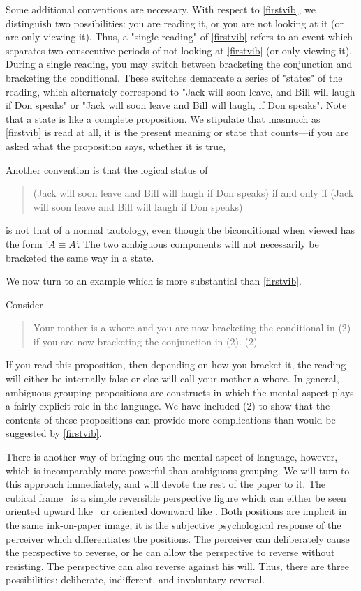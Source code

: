 Some additional conventions are necessary. With respect to \ref{firstvib}, we 
distinguish two possibilities: you are reading it, or you are not looking at it 
(or are only viewing it). Thus, a "single reading" of \ref{firstvib} refers to an event 
which separates two consecutive periods of not looking at \ref{firstvib} (or only 
viewing it). During a single reading, you may switch between bracketing the 
conjunction and bracketing the conditional. These switches demarcate a 
series of "states" of the reading, which alternately correspond to "Jack will 
soon leave, and Bill will laugh if Don speaks" or "Jack will soon leave and Bill 
will laugh, if Don speaks". Note that a state is like a complete proposition. 
We stipulate that inasmuch as \ref{firstvib} is read at all, it is the present meaning or 
state that counts---if you are asked what the proposition says, whether it is 
true, \etc

Another convention is that the logical status of 
\begin{quotation}
(Jack will soon leave and Bill will laugh if Don speaks) if and only if (Jack 
will soon leave and Bill will laugh if Don speaks) 
\end{quotation}
is not that of a normal tautology, even though the biconditional when 
viewed has the form '$A\equiv A$'. The two ambiguous components will not 
necessarily be bracketed the same way in a state. 

We now turn to an example which is more substantial than \ref{firstvib}.

Consider 

\begin{quotation}
Your mother is a whore and you are now bracketing the conditional in (2) if 
you are now bracketing the conjunction in (2). (2) 
\end{quotation}

If you read this proposition, then depending on how you bracket it, the 
reading will either be internally false or else will call your mother a whore. In 
general, ambiguous grouping propositions are constructs in which the mental 
aspect plays a fairly explicit role in the language. We have included (2) to 
show that the contents of these propositions can provide more complications 
than would be suggested by \ref{firstvib}.

There is another way of bringing out the mental aspect of language, 
however, which is incomparably more powerful than ambiguous grouping. 
We will turn to this approach immediately, and will devote the rest of the 
paper to it. The cubical frame \cubeframe\ is a simple reversible perspective figure 
which can either be seen oriented upward like \cubeup\ or oriented downward 
like \cubedown. Both positions are implicit in the same ink-on-paper image; it is 
the subjective psychological response of the perceiver which differentiates 
the positions. The perceiver can deliberately cause the perspective to reverse, 
or he can allow the perspective to reverse without resisting. The perspective 
can also reverse against his will. Thus, there are three possibilities: deliberate, 
indifferent, and involuntary reversal. 

